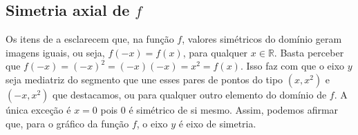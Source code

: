\subsection{Simetria axial de \(f\)}

Os itens de  a  esclarecem que, na função \(f\), valores simétricos do domínio geram imagens iguais, ou seja, \(f(-x) = f(x)\), para qualquer \(x \in \mathbb{R}\). Basta perceber que \(f(-x) = (-x)^{2} = (-x)(-x) = x^{2} = f(x)\). Isso faz com que o eixo \(y\) seja mediatriz do segmento que une esses pares de pontos do tipo \((x,x^{2})\) e \((-x,x^{2})\) que destacamos, ou para qualquer outro elemento do domínio de \(f\). A única exceção é \(x=0\) pois 0 é simétrico de si mesmo. Assim, podemos afirmar que, para o gráfico da função \(f\), o eixo \(y\) é eixo de simetria.

